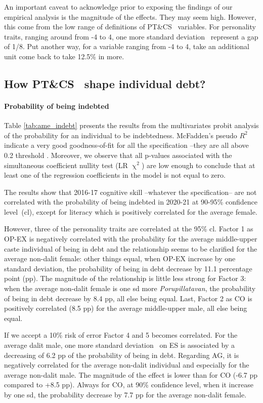 \documentclass[a4paper, 11pt, onecolumn]{article}
\newcommand{\sd}{standard deviation}
\newcommand{\aebe}{all else being equal}
\newcommand{\ote}{other things equal}
\newcommand{\cl}{confidence level}
\newcommand{\PTCS}{PT\&CS}
\begin{document}
An important caveat to acknowledge prior to exposing the findings of our empirical analysis is the magnitude of the effects.
They may seem high. 
However, this come from the low range of definitions of \PTCS~ variables.
For personality traits, ranging around from -4 to 4, one more \sd~ represent a gap of 1/8.
Put another way, for a variable ranging from -4 to 4, take an additional unit come back to take 12.5\% in more.

\subsection{How \PTCS~ shape individual debt?}
\paragraph{Probability of being indebted}
Table \ref{tab:ame_indebt} presents the results from the multivariates probit analysis of the probability for an individual to be indebtedness.
McFadden's pseudo $R^2$ indicate a very good goodness-of-fit for all the specification --they are all above 0.2 threshold \citep{McFadden1979}.
Moreover, we observe that all p-values associated with the simultaneous coefficient nullity test (LR $\upchi^2$) are low enough to conclude that at least one of the regression coefficients in the model is not equal to zero.

The results show that 2016-17 cognitive skill --whatever the specification-- are not correlated with the probability of being indebted in 2020-21 at 90-95\% \cl~(cl), except for literacy which is positively correlated for the average female.

However, three of the personality traits are correlated at the 95\% cl. 
Factor 1 as OP-EX is negatively correlated with the probability for the average middle-upper caste individual of being in debt and the relationship seems to be clarified for the average non-dalit female: \ote, when OP-EX increase by one \sd, the probability of being in debt decrease by 11.1 percentage point (pp).
The magnitude of the relationship is little less strong for Factor 3: when the average non-dalit female is one sd more \textit{Porupillatavan}, the probability of being in debt decrease by 8.4 pp, \aebe. 
Last, Factor 2 as CO is positively correlated (8.5 pp) for the average middle-upper male, \aebe.

If we accept a 10\% risk of error Factor 4 and 5 becomes correlated.
For the average dalit male, one more \sd~ on ES is associated by a decreasing of 6.2 pp of the probability of being in debt.
Regarding AG, it is negatively correlated for the average non-dalit individual and especially for the average non-dalit male.
The magnitude of the effect is lower than for CO (-6.7 pp compared to +8.5 pp).
Always for CO, at 90\% \cl, when it increase by one sd, the probability decrease by 7.7 pp for the average non-dalit female.
\end{document}
